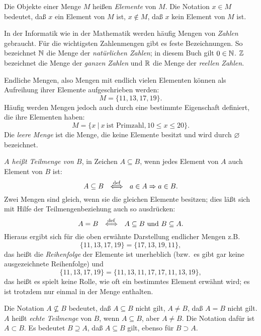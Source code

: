 Die Objekte einer Menge $M$ heißen \emph{Elemente} von $M$. Die Notation
$ x \in M$ 
bedeutet, daß $x$ ein Element von $M$ ist, $x \not \in M$, daß $x$ kein
Element von $M$ ist.

In der Informatik wie in der Mathematik werden häufig Mengen von \emph{Zahlen} gebraucht.  Für die wichtigsten
Zahlenmengen gibt es feste Bezeichnungen.  So bezeichnet $\mathbb{N}$
die Menge der \emph{natürlichen Zahlen};  in diesem Buch gilt
$0\in\mathbb{N}$. 
$\mathbb{Z}$ bezeichnet die Menge der \emph{ganzen Zahlen} und $\mathbb{R}$ die Menge der
\emph{reellen Zahlen}.

Endliche Mengen, also Mengen mit endlich vielen Elementen
können als Aufreihung ihrer Elemente aufgeschrieben werden:
\[M = \{ 11, 13, 17, 19\}.\]
Häufig werden Mengen jedoch auch durch eine bestimmte Eigenschaft de\-fi\-niert,
die ihre Elementen haben:
\[M = \{x\ |\ x\ \mbox{ist Primzahl}, 10 \le x \le 20\}.\]
Die \emph{leere Menge} %
ist die Menge, die keine Elemente besitzt und wird
durch $\varnothing$ bezeichnet.

\emph{$A$ heißt Teilmenge von $B$}, in Zeichen $A \subseteq B$, 
wenn jedes Element von $A$ auch Element von $B$ ist:
\[A \subseteq B\ \ \diff\ \ 
a \in A \Rightarrow a \in B.\]
Zwei Mengen sind gleich, wenn sie die gleichen Elemente besitzen; 
dies läßt sich mit Hilfe der Teilmengenbeziehung auch so ausdrücken:
\[A = B\ \ \stackrel{\rm def}{\Longleftrightarrow}\ \ A \subseteq B\ \mbox{und}\ B \subseteq A.\]
Hieraus ergibt sich für die oben erwähnte Darstellung endlicher Mengen
z.B.
\[\{11,13,17,19\} =\{17,13,19,11\},\]
das heißt die \emph{Reihenfolge} der Elemente ist unerheblich (bzw.\ es gibt
gar keine ausgezeichnete Reihenfolge) und
\[\{11,13,17,19\} = \{11,13,11,17,17,11,13,19\},\]
das heißt es spielt keine Rolle, wie oft ein bestimmtes Element erwähnt wird; es
ist trotzdem nur einmal in der Menge enthalten.

Die Notation $A \not \subseteq B$ bedeutet, daß $A \subseteq B$ nicht gilt, $A
\not = B$, daß $A = B$ nicht gilt. $A$ heißt \emph{echte Teilmenge} von $B$,
wenn $A \subseteq B$, aber $A \not = B$. Die Notation dafür ist $A \subset B$.
\index{*@$\subset$}\index{*@$\supseteq$}\index{*@$\supset$}
Es bedeutet $B \supseteq A$, daß $A \subseteq B$ gilt, ebenso für
$B \supset A$. 


